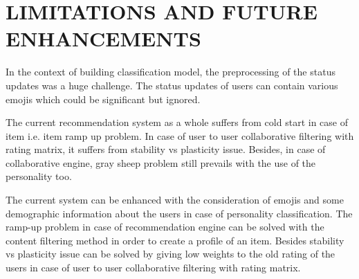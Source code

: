 \newpage
\section{LIMITATIONS AND FUTURE ENHANCEMENTS}
In the context of building classification model, the preprocessing of the status updates was a huge challenge. The status updates of users can contain various emojis which could be significant but ignored. 

The current recommendation system as a whole suffers from cold start in case of item i.e. item ramp up problem. In case of user to user collaborative filtering with rating matrix, it suffers from stability vs plasticity issue. Besides, in case of collaborative engine, gray sheep problem still prevails with the use of the personality too.

The current system can be enhanced with the consideration of emojis and some demographic information about the users in case of personality classification. The ramp-up problem in case of recommendation engine can be solved with the content filtering method in order to create a profile of an item. Besides stability vs plasticity issue can be solved by giving low weights to the old rating of the users in case of user to user collaborative filtering with rating matrix.
